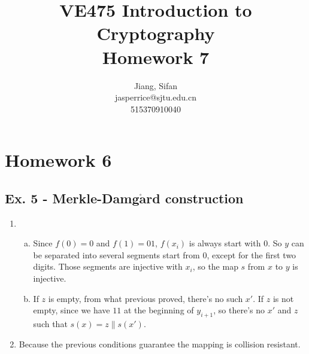 \documentclass[11pt,a4paper]{article}
\title{
	VE475 Introduction to Cryptography \\
	Homework 7
}
\author{
	Jiang, Sifan\\
	jasperrice@sjtu.edu.cn\\
	515370910040
}
\begin{document}
\maketitle
\section*{Homework 6}
\subsection*{Ex. 5 - Merkle-Damg$\mathrm{\mathbf{\mathring{a}}}$rd construction}
\begin{enumerate}
\item \begin{enumerate}[a)]
\item Since $f(0)=0$ and $f(1)=01$, $f(x_{i})$ is always start with $0$. So $y$ can be separated into several segments start from $0$, except for the first two digits. Those segments are injective with $x_{i}$, so the map $s$ from $x$ to $y$ is injective.

\item If $z$ is empty, from what previous proved, there's no such $x'$. If $z$ is not empty, since we have $11$ at the beginning of $y_{i+1}$, so there's no $x'$ and $z$ such that $s(x) = z \| s(x')$.
\end{enumerate}

\item Because the previous conditions guarantee the mapping is collision resistant.


\end{enumerate}
\end{document}
